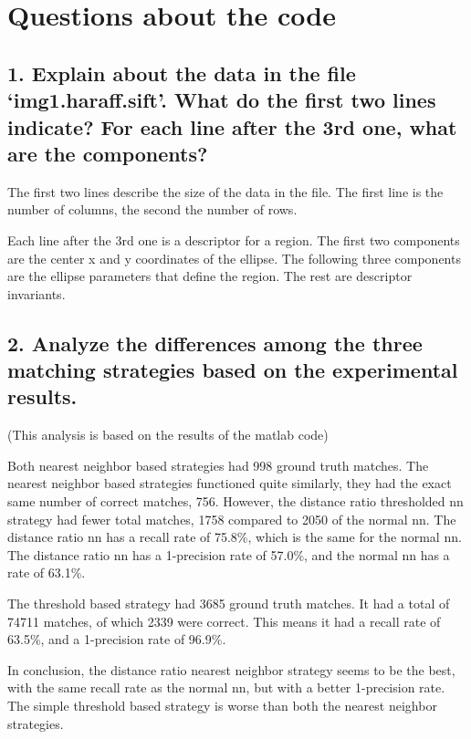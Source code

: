 \section{Questions about the code}

\subsection{1. Explain about the data in the file ‘img1.haraff.sift’. What do
the first two lines indicate?  For each line after the 3rd one, what are the
components?}

The first two lines describe the size of the data in the file. The first line
is the number of columns, the second the number of rows.

Each line after the 3rd one is a descriptor for a region. The first two
components are the center x and y coordinates of the ellipse. The following
three components are the ellipse parameters that define the region. The rest
are descriptor invariants.

\subsection{2. Analyze the differences among the three matching strategies
based on the experimental results.}

(This analysis is based on the results of the matlab code)

Both nearest neighbor based strategies had 998 ground truth matches.
The nearest neighbor based strategies functioned quite similarly, they had the
exact same number of correct matches, 756. However, the distance ratio
thresholded nn strategy had fewer total matches, 1758 compared to 2050 of the
normal nn. The distance ratio nn has a recall rate of 75.8\%, which is the
same for the normal nn. The distance ratio nn has a 1-precision rate of
57.0\%, and the normal nn has a rate of 63.1\%.

The threshold based strategy had 3685 ground truth matches. It had a total of
74711 matches, of which 2339 were correct. This means it had a recall rate of
63.5\%, and a 1-precision rate of 96.9\%.

In conclusion, the distance ratio nearest neighbor strategy seems to be the
best, with the same recall rate as the normal nn, but with a better 1-precision
rate. The simple threshold based strategy is worse than both the nearest
neighbor strategies.









